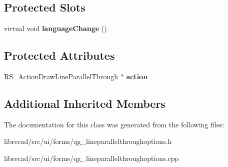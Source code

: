 \subsection*{Protected Slots}
\begin{DoxyCompactItemize}
\item 
\hypertarget{classQG__LineParallelThroughOptions_a658a55747eeaf72951014ae6f4ff6191}{virtual void {\bfseries language\-Change} ()}\label{classQG__LineParallelThroughOptions_a658a55747eeaf72951014ae6f4ff6191}

\end{DoxyCompactItemize}
\subsection*{Protected Attributes}
\begin{DoxyCompactItemize}
\item 
\hypertarget{classQG__LineParallelThroughOptions_a5f58960982ab1ff0c307693913d69c37}{\hyperlink{classRS__ActionDrawLineParallelThrough}{R\-S\-\_\-\-Action\-Draw\-Line\-Parallel\-Through} $\ast$ {\bfseries action}}\label{classQG__LineParallelThroughOptions_a5f58960982ab1ff0c307693913d69c37}

\end{DoxyCompactItemize}
\subsection*{Additional Inherited Members}


The documentation for this class was generated from the following files\-:\begin{DoxyCompactItemize}
\item 
librecad/src/ui/forms/qg\-\_\-lineparallelthroughoptions.\-h\item 
librecad/src/ui/forms/qg\-\_\-lineparallelthroughoptions.\-cpp\end{DoxyCompactItemize}
